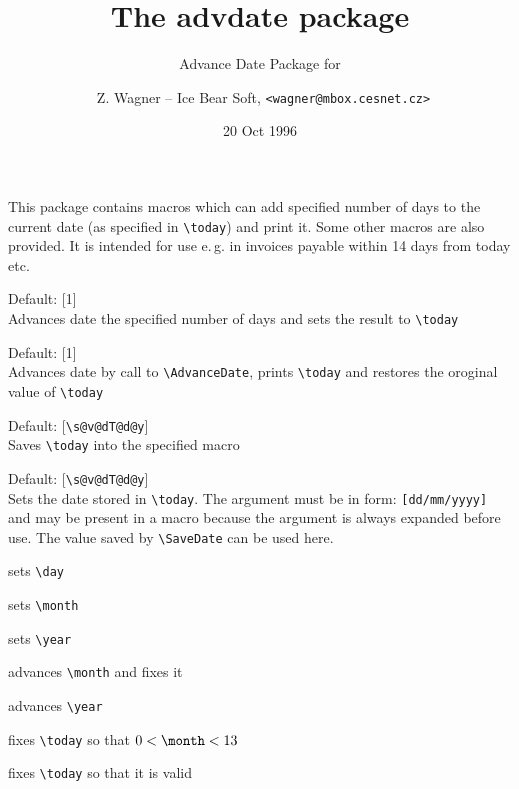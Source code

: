 \documentclass[DIV=11, fontsize=12pt, pagesize=auto]{scrartcl}
\title{The \textsf{advdate} package}
\subtitle{Advance Date Package for \LaTeXe}
\author{\textcopyright\ Z. Wagner -- Ice Bear Soft, \texttt{<wagner@mbox.cesnet.cz>}}
\date{20 Oct 1996}
\begin{document}
\maketitle

\noindent
This package contains macros which can add specified number of days
to the current date (as specified in \verb+\today+) and print it. Some other
macros are also provided. It is intended for use e.\,g. in invoices
payable within 14 days from today etc.



\begin{labeling}{\string\AdvanceDate}
\item[\string\AdvanceDate]   Default: [1]\\
     Advances date the specified number of days and sets the result
     to \verb+\today+
\item[\string\DayAfter]      Default: [1]\\
     Advances date by call to \verb+\AdvanceDate+, prints \verb+\today+ and restores
     the oroginal value of \verb+\today+
\item[\string\SaveDate]      Default: [\verb+\s@v@dT@d@y+]\\
     Saves \verb+\today+ into the specified macro
\item[\string\SetDate]       Default: [\verb+\s@v@dT@d@y+]\\
     Sets the date stored in \verb+\today+. The argument must be in form:
     \texttt{[dd/mm/yyyy]} and may be present in a macro because the argument
     is always expanded before use. The value saved by \verb+\SaveDate+ can
     be used here.
\end{labeling}

     

\begin{labeling}{\string\ThisMonth}
\item[\string\ThisDay]     sets \verb+\day+
\item[\string\ThisMonth]   sets \verb+\month+
\item[\string\ThisYear]    sets \verb+\year+
\item[\string\AdvMonth]    advances \verb+\month+ and fixes it
\item[\string\AdvYear]     advances \verb+\year+
\end{labeling}



\begin{labeling}{\string\FixMonth}
\item[\string\FixMonth]    fixes \verb+\today+ so that $0 < \verb+\month+ < 13$
\item[\string\FixDate]     fixes \verb+\today+ so that it is valid
\end{labeling}
\end{document}
